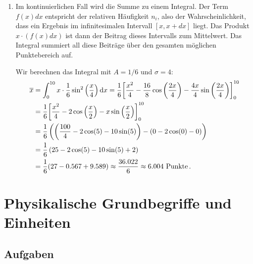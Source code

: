 \documentclass[ngerman]{scrreprt}
\newenvironment{loesungbox}[1]
  {\needspace{5\baselineskip}\begin{loesungboxstyle}[frametitle={#1}]}
  {\end{loesungboxstyle}}
\begin{document}
\begin{loesungbox}{Lösung zu \Cref{aufg:haeufigkeitsverteilung}}
\begin{enumerate}
    \item Im kontinuierlichen Fall wird die Summe zu einem Integral. Der Term $f(x)dx$ entspricht der relativen Häufigkeit $n_i$, also der Wahrscheinlichkeit, dass ein Ergebnis im infinitesimalen Intervall $[x, x+dx]$ liegt. Das Produkt $x \cdot (f(x)dx)$ ist dann der Beitrag dieses Intervalls zum Mittelwert. Das Integral summiert all diese Beiträge über den gesamten möglichen Punktebereich auf.
    
    Wir berechnen das Integral mit $A=1/6$ und $\sigma=4$:
    \begin{align}
        \overline{x} &= \int_{0}^{10}x\cdot\frac{1}{6}\sin^2\left(\frac{x}{4}\right)\mathrm{d} x = \frac{1}{6} {\left[ \frac{x^2}{4}-\frac{16}{8}\cos\left(\frac{2x}{4}\right)-\frac{4x}{4}\sin\left(\frac{2x}{4}\right) \right]}_{0}^{10} \nonumber \\
        &= \frac{1}{6} {\left[ \frac{x^2}{4}-2\cos\left(\frac{x}{2}\right)-x\sin\left(\frac{x}{2}\right) \right]}_{0}^{10} \nonumber \\
        &= \frac{1}{6} \left( \left( \frac{100}{4}-2\cos(5)-10\sin(5) \right) - \left( 0-2\cos(0)-0 \right) \right) \nonumber \\
        &= \frac{1}{6} \left( 25 - 2\cos(5) - 10\sin(5) + 2 \right) \nonumber \\
        &= \frac{1}{6} (27 - \num{0.567} + \num{9.589}) \approx \frac{\num{36.022}}{6} \approx \num{6.004} \text{ Punkte} \,.
    \end{align}
\end{enumerate}
\end{loesungbox}



\chapter{Physikalische Grundbegriffe und Einheiten}\label{chap: grundbegriffe}
\section{Aufgaben}\label{sec: grundbegriffe_aufgaben}
\end{document}
